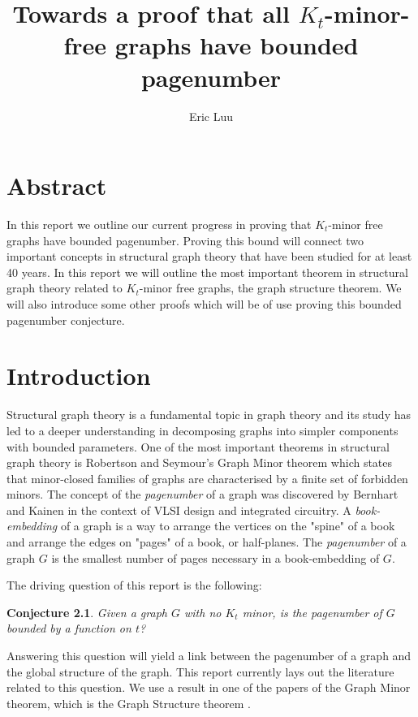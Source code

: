 \documentclass[]{report}
\title{Towards a proof that all $K_t$-minor-free graphs have bounded pagenumber}
\author{Eric Luu}
\newtheorem{conjecture}[theorem]{Conjecture}
\theoremstyle{definition}
\numberwithin{theorem}{section}
\numberwithin{equation}{section}
\begin{document}
\maketitle
\chapter{Abstract}\label{abstract}
In this report we outline our current progress in proving that $K_t$-minor free graphs have bounded pagenumber. Proving this bound will connect two important concepts in structural graph theory that have been studied for at least 40 years. In this report we will outline the most important theorem in structural graph theory related to $K_t$-minor free graphs, the graph structure theorem. We will also introduce some other proofs which will be of use proving this bounded pagenumber conjecture. 
\chapter{Introduction}\label{sec:introduction}
Structural graph theory is a fundamental topic in graph theory and its study has led to a deeper understanding in decomposing graphs into simpler components with bounded parameters. One of the most important theorems in structural graph theory is Robertson and Seymour's Graph Minor theorem \cite{robertsonGraphMinorsXX2004} which states that minor-closed families of graphs are characterised by a finite set of forbidden minors. 
The concept of the \textit{pagenumber} of a graph was discovered by Bernhart and Kainen \cite{bernhartBookThicknessGraph1979} in the context of VLSI design and integrated circuitry. A \textit{book-embedding} of a graph is a way to arrange the vertices on the "spine" of a book and arrange the edges on "pages" of a book, or half-planes. The \textit{pagenumber} of a graph $G$ is the smallest number of pages necessary in a book-embedding of $G$. 

The driving question of this report is the following: 
\begin{conjecture}\label{conj:bded_had_pn}
	Given a graph $G$ with no $K_t$ minor, is the pagenumber of $G$ bounded by a function on $t$?
\end{conjecture}
Answering this question will yield a link between the pagenumber of a graph and the global structure of the graph. This report currently lays out the literature related to this question. We use a result in one of the papers of the Graph Minor theorem, which is the Graph Structure theorem \cite{robertsonGraphMinorsXVI2003}.
\end{document}
